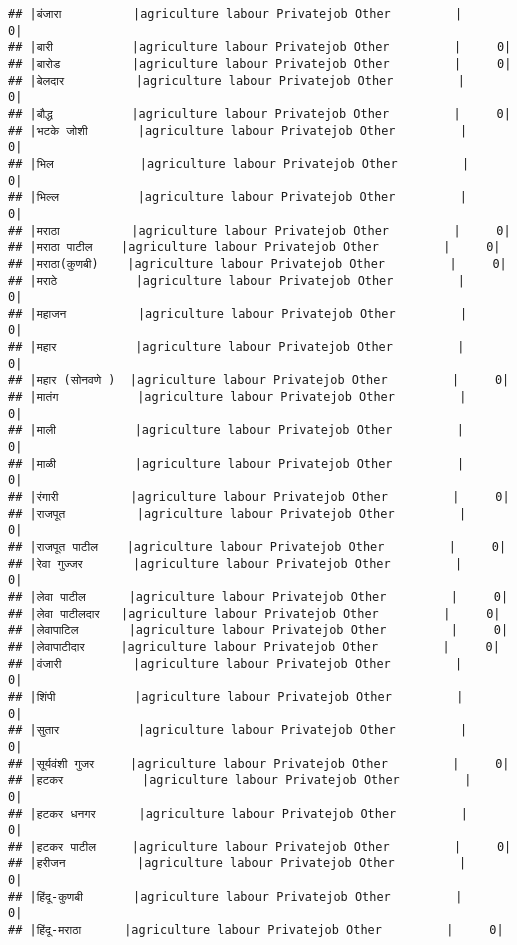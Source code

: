 \documentclass[
]{article}
\begin{document}
\begin{verbatim}
## |बंजारा          |agriculture labour Privatejob Other         |     0|
## |बारी           |agriculture labour Privatejob Other         |     0|
## |बारोड          |agriculture labour Privatejob Other         |     0|
## |बेलदार          |agriculture labour Privatejob Other         |     0|
## |बौद्ध           |agriculture labour Privatejob Other         |     0|
## |भटके जोशी       |agriculture labour Privatejob Other         |     0|
## |भिल            |agriculture labour Privatejob Other         |     0|
## |भिल्ल           |agriculture labour Privatejob Other         |     0|
## |मराठा          |agriculture labour Privatejob Other         |     0|
## |मराठा पाटील    |agriculture labour Privatejob Other         |     0|
## |मराठा(कुणबी)    |agriculture labour Privatejob Other         |     0|
## |मराठे           |agriculture labour Privatejob Other         |     0|
## |महाजन          |agriculture labour Privatejob Other         |     0|
## |महार           |agriculture labour Privatejob Other         |     0|
## |महार (सोनवणे )  |agriculture labour Privatejob Other         |     0|
## |मातंग           |agriculture labour Privatejob Other         |     0|
## |माली           |agriculture labour Privatejob Other         |     0|
## |माळी           |agriculture labour Privatejob Other         |     0|
## |रंगारी          |agriculture labour Privatejob Other         |     0|
## |राजपूत          |agriculture labour Privatejob Other         |     0|
## |राजपूत पाटील    |agriculture labour Privatejob Other         |     0|
## |रेवा गुज्जर       |agriculture labour Privatejob Other         |     0|
## |लेवा पाटील      |agriculture labour Privatejob Other         |     0|
## |लेवा पाटीलदार   |agriculture labour Privatejob Other         |     0|
## |लेवापाटिल       |agriculture labour Privatejob Other         |     0|
## |लेवापाटीदार     |agriculture labour Privatejob Other         |     0|
## |वंजारी          |agriculture labour Privatejob Other         |     0|
## |शिंपी           |agriculture labour Privatejob Other         |     0|
## |सुतार           |agriculture labour Privatejob Other         |     0|
## |सूर्यवंशी गुजर     |agriculture labour Privatejob Other         |     0|
## |हटकर           |agriculture labour Privatejob Other         |     0|
## |हटकर धनगर      |agriculture labour Privatejob Other         |     0|
## |हटकर पाटील     |agriculture labour Privatejob Other         |     0|
## |हरीजन          |agriculture labour Privatejob Other         |     0|
## |हिंदू-कुणबी       |agriculture labour Privatejob Other         |     0|
## |हिंदू-मराठा      |agriculture labour Privatejob Other         |     0|

\end{verbatim}
\end{document}
